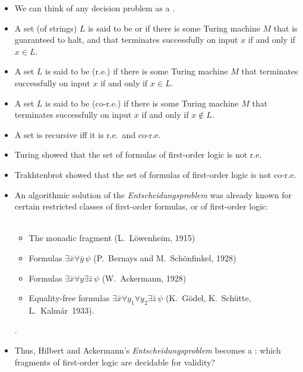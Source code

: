 \documentclass{beamer}
\begin{document}
\begin{frame}
\begin{itemize}
\item We can think of any decision problem as a .
\item A set (of strings) $L$ is said to be  or  if there is some Turing machine $M$ that is guaranteed to halt, and that terminates successfully on input $x$ if and only if $x \in L$.
\item A set $L$ is said to be  (r.e.) if there is some Turing machine $M$ that terminates successfully on input $x$ if and only if $x \in L$.
\item A set $L$ is said to be  (co-r.e.) if there is some Turing machine $M$ that terminates successfully on input $x$ if and only if $x \not \in L$.
\item A set is recursive iff it is r.e.~and co-r.e.
\end{itemize}
\end{frame}


\begin{frame}
\begin{itemize}
\item Turing showed that the set of 
formulas of first-order logic is not r.e.
\item Trakhtenbrot showed that the set of 
formulas of first-order logic is not co-r.e.
\end{itemize}
\end{frame}


\begin{frame}
	\begin{itemize}	
		\item An algorithmic solution of the
		{\em Entscheidungsproblem} was already known for certain 
		restricted classes of first-order formulas, or  of first-order logic:\\
		\ \\
		\begin{itemize}
			\item The monadic fragment (L.~L\"{o}wenheim, 1915)
			\item Formulas $\exists \bar{x} \forall \bar{y}\, \psi$ (P.~Bernays and M.~Sch\"{o}nfinkel, 1928)
			\item Formulas $\exists \bar{x} \forall y \exists \bar{z}\, \psi$ (W.~Ackermann, 1928)
			\item Equality-free formulas $\exists \bar{x} \forall y_1 \forall y_2 \exists \bar{z}\, \psi$ 	
			(K.~G\"{o}del, K.~Sch\"{u}tte, 
			L.~Kalm\'{a}r~1933).
		\end{itemize}.
		\item Thus, Hilbert and Ackermann's \textit{Entscheidungsproblem} becomes a : which fragments of first-order logic are decidable for validity?
	\end{itemize}
\end{frame}
\end{document}
